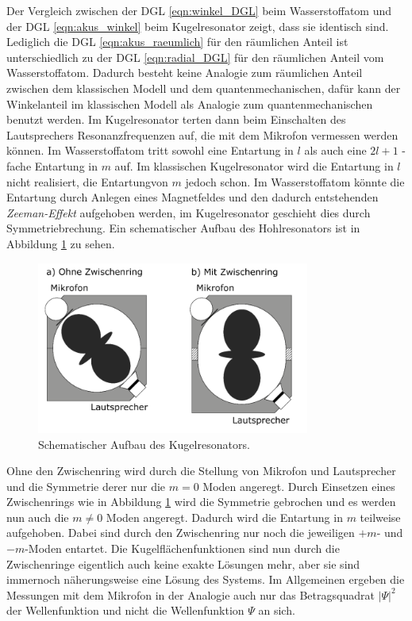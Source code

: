 Der Vergleich zwischen der DGL \eqref{eqn:winkel_DGL} beim Wasserstoffatom und der DGL \eqref{eqn:akus_winkel} beim Kugelresonator zeigt, dass sie identisch sind. Lediglich die DGL \eqref{eqn:akus_raeumlich} für den räumlichen Anteil ist unterschiedlich zu der DGL \eqref{eqn:radial_DGL} für den räumlichen Anteil vom Wasserstoffatom. Dadurch besteht keine Analogie zum räumlichen Anteil zwischen dem klassischen Modell und dem quantenmechanischen, dafür kann der Winkelanteil im klassischen Modell als Analogie zum quantenmechanischen benutzt werden. Im Kugelresonator terten dann beim Einschalten des Lautsprechers Resonanzfrequenzen auf, die mit dem Mikrofon vermessen werden können. Im Wasserstoffatom tritt sowohl eine Entartung in $l$ als auch eine $2l+1$ -fache Entartung in $m$ auf. Im klassischen Kugelresonator wird die Entartung in $l$ nicht realisiert, die Entartungvon $m$ jedoch schon. Im Wasserstoffatom könnte die Entartung durch Anlegen eines Magnetfeldes und den dadurch entstehenden \textit{Zeeman-Effekt} aufgehoben werden, im Kugelresonator geschieht dies durch Symmetriebrechung. Ein schematischer Aufbau des Hohlresonators ist in Abbildung \ref{fig:modell} zu sehen.

\begin{figure}[H]
    \centering
    \includegraphics[width=0.8\textwidth]{Skizze.PNG}
    \caption{Schematischer Aufbau des Kugelresonators. \cite{Anleitung}}
    \label{fig:modell}
\end{figure}

Ohne den Zwischenring wird durch die Stellung von Mikrofon und Lautsprecher und die Symmetrie derer nur die $m=0$ Moden angeregt. Durch Einsetzen eines Zwischenrings wie in Abbildung \ref{fig:modell} wird die Symmetrie gebrochen und es werden nun auch die $m \neq 0$ Moden angeregt. Dadurch wird die Entartung in $m$ teilweise aufgehoben. Dabei sind durch den Zwischenring nur noch die jeweiligen $+m$- und $-m$-Moden entartet. Die Kugelflächenfunktionen sind nun durch die Zwischenringe eigentlich auch keine exakte Lösungen mehr, aber sie sind immernoch näherungsweise eine Lösung des Systems. Im Allgemeinen ergeben die Messungen mit dem Mikrofon in der Analogie auch nur das Betragsquadrat $|\Psi|^2$ der Wellenfunktion und nicht die Wellenfunktion $\Psi$ an sich.

